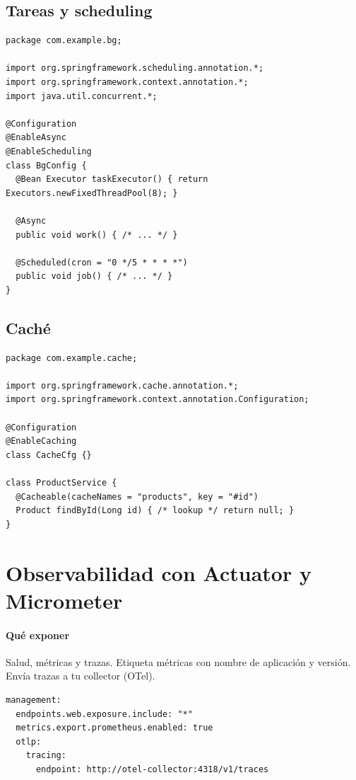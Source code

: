 \documentclass[11pt,a4paper]{article}
\begin{document}
\subsection{Tareas y scheduling}
\begin{lstlisting}[style=javastyle, caption={@Async y @Scheduled con pools dedicados}]
package com.example.bg;

import org.springframework.scheduling.annotation.*;
import org.springframework.context.annotation.*;
import java.util.concurrent.*;

@Configuration
@EnableAsync
@EnableScheduling
class BgConfig {
  @Bean Executor taskExecutor() { return Executors.newFixedThreadPool(8); }

  @Async
  public void work() { /* ... */ }

  @Scheduled(cron = "0 */5 * * * *")
  public void job() { /* ... */ }
}
\end{lstlisting}

\subsection{Caché}
\begin{lstlisting}[style=javastyle, caption={Caché con Caffeine/Redis}]
package com.example.cache;

import org.springframework.cache.annotation.*;
import org.springframework.context.annotation.Configuration;

@Configuration
@EnableCaching
class CacheCfg {}

class ProductService {
  @Cacheable(cacheNames = "products", key = "#id")
  Product findById(Long id) { /* lookup */ return null; }
}
\end{lstlisting}

\section{Observabilidad con Actuator y Micrometer}
\paragraph{Qué exponer}
Salud, métricas y trazas. Etiqueta métricas con nombre de aplicación y versión. Envía trazas a tu collector (OTel).

\begin{lstlisting}[style=yamlstyle, caption={Actuator y exportación de métricas/trazas}]
management:
  endpoints.web.exposure.include: "*"
  metrics.export.prometheus.enabled: true
  otlp:
    tracing:
      endpoint: http://otel-collector:4318/v1/traces
\end{lstlisting}
\end{document}
